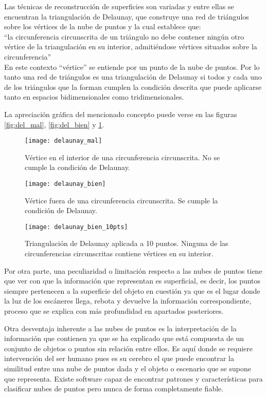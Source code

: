 Las técnicas de reconstrucción de superficies son variadas y entre ellas se encuentran la triangulación de
Delaunay, que construye una red de triángulos sobre los vértices de la nube de puntos y la cual establece que:
\\
``la circunferencia circunscrita de un triángulo no debe contener ningún otro vértice de la triangulación en su interior, admitiéndose vértices situados sobre la circunferencia''
\\
En este contexto ``vértice'' se entiende por un punto de la nube de puntos.
Por lo tanto una red de triángulos es una triangulación de Delaunay si todos y cada uno de los triángulos que la forman cumplen la condición descrita que puede aplicarse tanto en espacios bidimensionales como tridimensionales.

La apreciación gráfica del mencionado concepto puede verse en las figuras \ref{fig:del_mal}, \ref{fig:del_bien} y \ref{fig:del_bien_10pts}.

\begin{figure}[!htb]
  \texttt{[image: delaunay\_mal]} 
\caption{Vértice en el interior de una circunferencia circunscrita. No se cumple la condición de Delaunay.}
\label{fig:del_mal}
\endminipage\hfill
{}
 \texttt{[image: delaunay\_bien]}
\caption{Vértice fuera de una circunferencia circunscrita. Se cumple la condición de Delaunay.}
\label{fig:del_bien}
\endminipage\hfill
{}
  \texttt{[image: delaunay\_bien\_10pts]}
\caption{Triangulación de Delaunay aplicada a 10 puntos. Ninguna de las circunferencias circunscritas contiene vértices en su interior.}
\label{fig:del_bien_10pts}
\endminipage\hfill
\end{figure}


Por otra parte, una peculiaridad o limitación respecto a las nubes de puntos tiene que ver con que la
información que representan es superficial, es decir, los puntos siempre pertenecen a la superficie del
objeto en cuestión ya que es el lugar donde la luz de los escáneres llega, rebota y devuelve la
información correspondiente, proceso que se explica con más profundidad en apartados posteriores.

Otra desventaja inherente a las nubes de puntos es la interpretación de la información que contienen ya
que se ha explicado que está compuesta de un conjunto de objetos o puntos sin relación entre ellos. Es
aquí donde se requiere intervención del ser humano pues es su cerebro el que puede encontrar la similitud
entre una nube de puntos dada y el objeto o escenario que se supone que representa. Existe software capaz
de encontrar patrones y características para clasificar nubes de puntos pero nunca de forma
completamente fiable.

